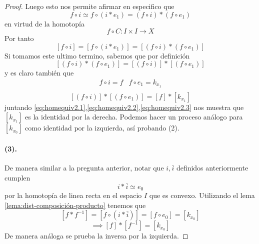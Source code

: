 \begin{proof}
Luego esto nos permite afirmar en especifico que
\[ f \circ i \simeq f \circ (i * e_1) = (f \circ i) * (f \circ e_1) \]
en virtud de la homotopía
\[ f \circ C : I \times I \to X \]
Por tanto
\begin{equation}\label{eq:homequiv2.1}
[f \circ i] = [f \circ (i * e_1)] = [(f \circ i) * (f \circ e_1)]
\end{equation}
Si tomamos este ultimo termino, sabemos que por definición
\begin{equation}\label{eq:homequiv2.2}
[(f \circ i) * (f \circ e_1)] = [(f \circ i)] * [(f \circ e_1)]
\end{equation}
y es claro también que
\[
  \begin{matrix}
    f \circ i = f & f \circ e_1 = k_{x_1} \\
  \end{matrix}
\]
\begin{equation}\label{eq:homequiv2.3}
[(f \circ i)] * [(f \circ e_1)] = [f] * [k_{x_1}]
\end{equation}
juntando
\eqref{eq:homequiv2.1},\eqref{eq:homequiv2.2},\eqref{eq:homequiv2.3} nos
muestra que \([k_{x_1}]\) es la identidad por la derecha. Podemos
hacer un proceso análogo para \([k_{x_0}]\) como identidad por la
izquierda, así probando (2).

\paragraph{(3).} De manera similar a la pregunta anterior, notar que \(i,
\bar{i}\) definidos anteriormente cumplen
\[ i * \bar{i} \simeq e_0 \]
por la homotopía de linea recta en el espacio \(I\) que es convexo.
Utilizando el lema \eqref{lema:dist-composición-producto} tenemos que
\[ [f * f^{-1}] = [f \circ (i * \bar{i})] = [f \circ e_0] = [k_{x_0}] \]
\[ \implies [f] * [f^{-1}] = [k_{x_0}] \]
De manera análoga se prueba la inversa por la izquierda.


\end{proof}

